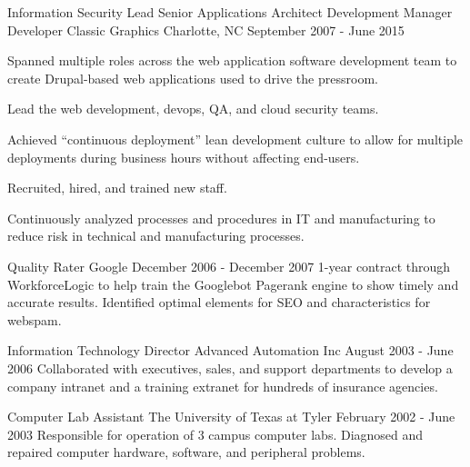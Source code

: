 \begin{cventries}

\cventry
{Information Security Lead \newline {\vspace{-.75mm}}
Senior Applications Architect \newline {\vspace{-.75mm}}
Development Manager \newline {\vspace{-.75mm}}
Developer}
{Classic Graphics} %
{Charlotte, NC} %
{September 2007 - June 2015} %
{
Spanned multiple roles across the web application software development team to create Drupal-based web applications used to drive the pressroom.
\begin{cvitems}
\item[]
\item {Lead the web development, devops, QA, and cloud security teams.}
\item {Achieved “continuous deployment” lean development culture to allow for multiple deployments during business hours without affecting end-users.}
\item {Recruited, hired, and trained new staff.}
\item {Continuously analyzed processes and procedures in IT and manufacturing to reduce risk in technical and manufacturing processes.}
\end{cvitems}
}


\cventry
{Quality Rater}
{Google}
{}
{December 2006 - December 2007} %
{ %
1-year contract through WorkforceLogic to help train the Googlebot Pagerank engine to show timely and accurate results. Identified optimal elements for SEO and characteristics for webspam.
}


\cventry
{Information Technology Director}
{Advanced Automation Inc}
{}
{August 2003 - June 2006} %
{ %
Collaborated with executives, sales, and support departments to develop a company intranet and a training extranet for hundreds of insurance agencies.
}


\cventry
{Computer Lab Assistant}
{The University of Texas at Tyler}
{}
{February 2002 - June 2003} %
{ %
Responsible for operation of 3 campus computer labs. Diagnosed and repaired computer hardware, software, and peripheral problems.
}


\end{cventries}
